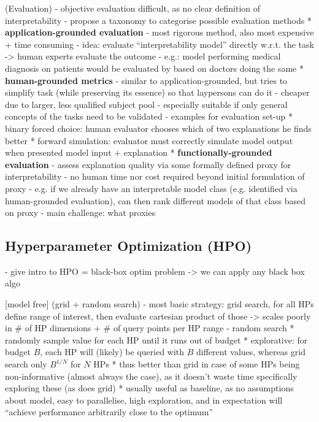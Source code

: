 \documentclass[twoside,11pt]{article}
\begin{document}
(Evaluation)
- objective evaluation difficult, as no clear definition of interpretability
- \citet[3]{DoshiVelez2017TowardsAR} propose a taxonomy to categorise possible evaluation methods
  * \textbf{application-grounded evaluation}
    - most rigorous method, also most expensive + time consuming
    - idea: evaluate ``interpretability model'' directly w.r.t. the task -> human experts evaluate the outcome
    - e.g.: model performing medical diagnosis on patients would be evaluated by based on doctors doing the same
  * \textbf{human-grounded metrics}
    - similar to application-grounded, but tries to simplify task (while preserving its essence) so that laypersons can do it
    - cheaper due to larger, less qualified subject pool
    - especially suitable if only general concepts of the tasks need to be validated
    - examples for evaluation set-up
      * binary forced choice: human evaluator chooses which of two explanations he finds better
      * forward simulation: evaluator must correctly simulate model output when presented model input + explanation %
  * \textbf{functionally-grounded evaluation}
    - assess explanation quality via some formally defined proxy for interpretability
    - no human time nor cost required beyond initial formulation of proxy
    - e.g. if we already have an interpretable model class (e.g. identified via human-grounded evaluation), can then rank different models of that class based on proxy
    - main challenge: what proxies

\subsection{Hyperparameter Optimization (HPO)}
- give intro to HPO = black-box optim problem -> we can apply any black box algo

[model free]
(grid + random search)
- most basic strategy: grid search, for all HPs define range of interest, then evaluate cartesian product of those -> scales poorly in \# of HP dimensions + \# of query points per HP range
- random search
  * randomly sample value for each HP until it runs out of budget
  * explorative: for budget $B$, each HP will (likely) be queried with $B$ different values, whereas grid search only $B^{1/N}$ for $N$ HPs
  * thus better than grid in case of some HPs being non-informative (almost always the case), as it doesn't waste time specifically exploring these (as does grid)
  * usually useful as baseline, as no assumptions about model, easy to parallelise, high exploration, and in expectation will ``achieve performance arbitrarily close to the optimum''
\end{document}
